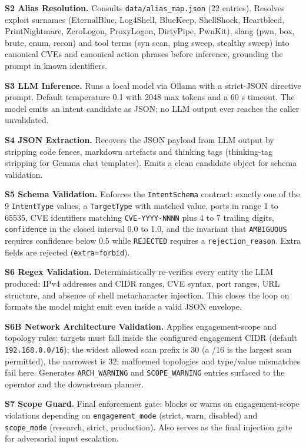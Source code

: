 \documentclass[10pt,journal,onecolumn]{IEEEtran}
\begin{document}
\textbf{S2 Alias Resolution.} Consults \texttt{data/alias\_map.json} (22 entries). Resolves exploit surnames (EternalBlue, Log4Shell, BlueKeep, ShellShock, Heartbleed, PrintNightmare, ZeroLogon, ProxyLogon, DirtyPipe, PwnKit), slang (pwn, box, brute, enum, recon) and tool terms (syn scan, ping sweep, stealthy sweep) into canonical CVEs and canonical action phrases before inference, grounding the prompt in known identifiers.

\textbf{S3 LLM Inference.} Runs a local model via Ollama with a strict-JSON directive prompt. Default temperature 0.1 with 2048 max tokens and a 60 s timeout. The model emits an intent candidate as JSON; no LLM output ever reaches the caller unvalidated.

\textbf{S4 JSON Extraction.} Recovers the JSON payload from LLM output by stripping code fences, markdown artefacts and thinking tags (thinking-tag stripping for Gemma chat templates). Emits a clean candidate object for schema validation.

\textbf{S5 Schema Validation.} Enforces the \texttt{IntentSchema} contract: exactly one of the 9 \texttt{IntentType} values, a \texttt{TargetType} with matched value, ports in range 1 to 65535, CVE identifiers matching \texttt{CVE-YYYY-NNNN} plus 4 to 7 trailing digits, \texttt{confidence} in the closed interval 0.0 to 1.0, and the invariant that \texttt{AMBIGUOUS} requires confidence below 0.5 while \texttt{REJECTED} requires a \texttt{rejection\_reason}. Extra fields are rejected (\texttt{extra=forbid}).

\textbf{S6 Regex Validation.} Deterministically re-verifies every entity the LLM produced: IPv4 addresses and CIDR ranges, CVE syntax, port ranges, URL structure, and absence of shell metacharacter injection. This closes the loop on formats the model might emit even inside a valid JSON envelope.

\textbf{S6B Network Architecture Validation.} Applies engagement-scope and topology rules: targets must fall inside the configured engagement CIDR (default \texttt{192.168.0.0/16}); the widest allowed scan prefix is 30 (a /16 is the largest scan permitted), the narrowest is 32; malformed topologies and type/value mismatches fail here. Generates \texttt{ARCH\_WARNING} and \texttt{SCOPE\_WARNING} entries surfaced to the operator and the downstream planner.

\textbf{S7 Scope Guard.} Final enforcement gate: blocks or warns on engagement-scope violations depending on \texttt{engagement\_mode} (strict, warn, disabled) and \texttt{scope\_mode} (research, strict, production). Also serves as the final injection gate for adversarial input escalation.
\end{document}
